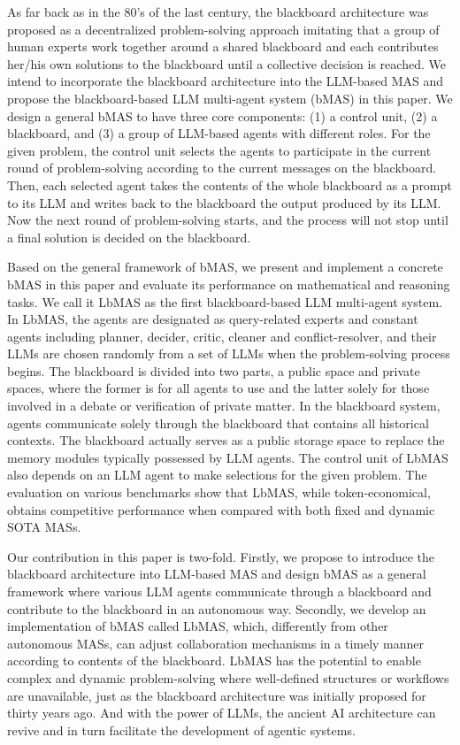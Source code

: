 \documentclass[11pt]{article}
\begin{document}
As far back as in the 80’s of the last century, the blackboard architecture was proposed \citep{nii1986blackboard,hayes-roth_blackboard_1985} as a decentralized problem-solving approach imitating that a group of human experts work together around a shared blackboard and each contributes her/his own solutions to the blackboard until a collective decision is reached. We intend to incorporate the blackboard architecture into the LLM-based MAS and propose the blackboard-based LLM multi-agent system (bMAS) in this paper. We design a general bMAS to have three core components: (1) a control unit, (2) a blackboard, and (3) a group of LLM-based agents with different roles. For the given problem, the control unit selects the agents to participate in the current round of problem-solving according to the current messages on the blackboard. Then, each selected agent takes the contents of the whole blackboard as a prompt to its LLM and writes back to the blackboard the output produced by its LLM. Now the next round of problem-solving starts, and the process will not stop until a final solution is decided on the blackboard. 

Based on the general framework of bMAS, we present and implement a concrete bMAS in this paper and evaluate its performance on mathematical and reasoning tasks. We call it LbMAS as the first blackboard-based LLM multi-agent system. In LbMAS, the agents are designated as query-related experts and constant agents including planner, decider, critic, cleaner and conflict-resolver, and their LLMs are chosen randomly from a set of LLMs when the problem-solving process begins. The blackboard is divided into two parts, a public space and private spaces, where the former is for all agents to use and the latter solely for those involved in a debate or verification of private matter. In the blackboard system, agents communicate solely through the blackboard that contains all historical contexts. The blackboard actually serves as a public storage space to replace the memory modules typically possessed by LLM agents. The control unit of LbMAS also depends on an LLM agent to make selections for the given problem. The evaluation on various benchmarks show that LbMAS, while token-economical, obtains competitive performance when compared with both fixed and dynamic SOTA MASs.

Our contribution in this paper is two-fold. Firstly, we propose to introduce the blackboard architecture into LLM-based MAS and design bMAS as a general framework where various LLM agents communicate through a blackboard and contribute to the blackboard in an autonomous way. Secondly, we develop an implementation of bMAS called LbMAS, which, differently from other autonomous MASs, can adjust collaboration mechanisms in a timely manner according to contents of the blackboard. LbMAS has the potential to enable complex and dynamic problem-solving where well-defined structures or workflows are unavailable, just as the blackboard architecture was initially proposed for thirty years ago. And with the power of LLMs, the ancient AI architecture can revive and in turn facilitate the development of agentic systems. 
\end{document}

